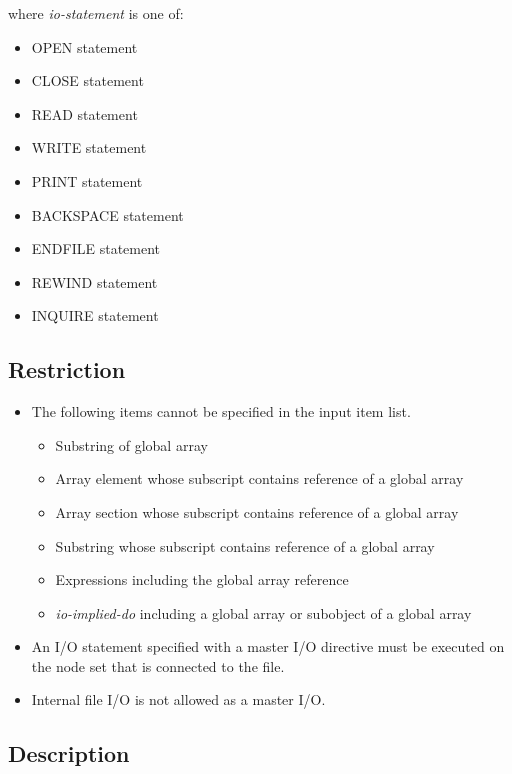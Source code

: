    where {\it io-statement} is one of:

   \begin{itemize}
    \item OPEN statement
    \item CLOSE statement
    \item READ statement
    \item WRITE statement
    \item PRINT statement
    \item BACKSPACE statement
    \item ENDFILE statement
    \item REWIND statement
    \item INQUIRE statement
   \end{itemize}

   \subsection*{Restriction}
   \begin{itemize}
    \item The following items cannot be specified in the input item list.
	  \begin{itemize}
	   \item Substring of global array
	   \item Array element whose subscript contains reference of a
		 global array
	   \item Array section whose subscript contains reference of a
		 global array
	   \item Substring whose subscript contains reference of a
		 global array
	   \item Expressions including the global array reference
	   \item {\it io-implied-do} including a global array or subobject of a global array
	  \end{itemize}

    \item An I/O statement specified with a master I/O directive must be
	  executed on the node set that is connected to the file.
    \item Internal file I/O is not allowed as a master I/O.
   \end{itemize}
	  
  \subsection*{Description}

